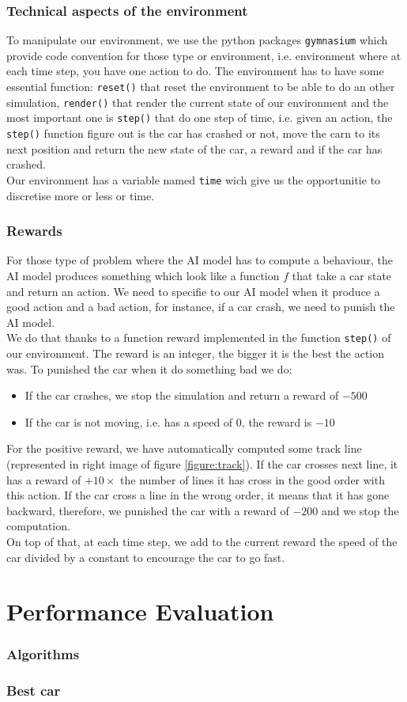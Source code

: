 \documentclass[11pt,a4paper]{article}
\newcounter{fig}
\newcommand{\mlist}[1]{\begin{itemize}[noitemsep,topsep=0pt]#1\end{itemize}}
\begin{document}
		\section{Technical aspects of the environment}
To manipulate our environment, we use the python packages \texttt{gymnasium} which provide code convention for those type or environment, i.e. environment where at each time step, you have one action to do. The environment has to have some essential function: \texttt{reset()} that reset the environment to be able to do an other simulation, \texttt{render()} that render the current state of our environment and the most important one is \texttt{step()} that do one step of time, i.e. given an action, the \texttt{step()} function figure out is the car has crashed or not, move the carn to its next position and return the new state of the car, a reward and if the car has crashed.\\
Our environment has a variable named \texttt{time} wich give us the opportunitie to discretise more or less or time.
		
		\section{Rewards}
For those type of problem where the AI model has to compute a behaviour, the AI model produces something which look like a function $f$ that take a car state and return an action. We need to specifie to our AI model when it produce a good action and a bad action, for instance, if a car crash, we need to punish the AI model.\\
We do that thanks to a function reward implemented in the function \texttt{step()} of our environment. The reward is an integer, the bigger it is the best the action was. To punished the car when it do something bad we do:
\mlist{
\item If the car crashes, we stop the simulation and return a reward of $-500$
\item If the car is not moving, i.e. has a speed of $0$, the reward is $-10$
}
For the positive reward, we have automatically computed some track line (represented in right image of figure \ref{figure:track}). If the car crosses next line, it has a reward of $+10\times$ the number of lines it has cross in the good order with this action. If the car cross a line in the wrong order, it means that it has gone backward, therefore, we punished the car with a reward of $-200$ and we stop the computation.\\
On top of that, at each time step, we add to the current reward the speed of the car divided by a constant to encourage the car to go fast.
	
	
	\part{Performance Evaluation}
		\section{Algorithms}
		
		\section{Best car}
\end{document}
